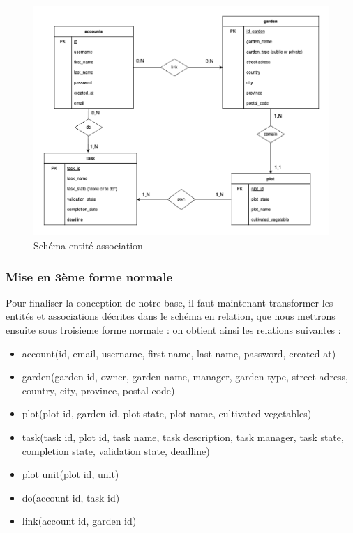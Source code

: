 \documentclass[french,a4paper]{article}
\begin{document}
\begin{figure}[H]
    \centering
    \includegraphics[width=1\textwidth]{img/Schema_entite_association_PPIIversion2.drawio.png}
    \caption{Schéma entité-association}
\end{figure}

\subsubsection{Mise en 3ème forme normale}
Pour finaliser la conception de notre base, il faut maintenant transformer les entités et associations décrites dans le schéma en 
relation, que nous mettrons ensuite sous troisieme forme normale : on obtient ainsi les relations suivantes : 
\begin{itemize}
    \item account(id, email, username, first name, last name, password, created at)
    \item garden(garden id, owner, garden name, manager, garden type, street adress, country, city, province, postal code)
    \item plot(plot id, garden id, plot state, plot name, cultivated vegetables)
    \item task(task id, plot id, task name, task description, task manager, task state, completion state, validation state, deadline)
    \item plot unit(plot id, unit)
    \item do(account id, task id)
    \item link(account id, garden id)
\end{itemize}
\end{document}
